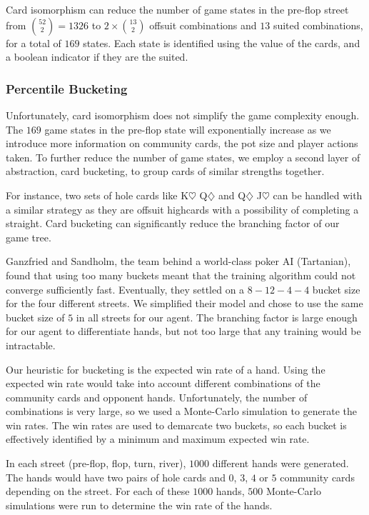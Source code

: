 \documentclass{article}
\begin{document}
Card isomorphism can reduce the number of game states in the pre-flop street from ${52 \choose 2} = 1326$ to $2 \times {13 \choose 2}$ offsuit combinations and $13$ suited combinations, for a total of $169$ states. Each state is identified using the value of the cards, and a boolean indicator if they are the suited.

\subsubsection{Percentile Bucketing}
Unfortunately, card isomorphism does not simplify the game complexity enough. The $169$ game states in the pre-flop state will exponentially increase as we introduce more information on community cards, the pot size and player actions taken. To further reduce the number of game states, we employ a second layer of abstraction, card bucketing, to group cards of similar strengths together. 

For instance, two sets of hole cards like K$\heartsuit$ Q$\diamondsuit$ and Q$\diamondsuit$ J$\heartsuit$ can be handled with a similar strategy as they are offsuit highcards with a possibility of completing a straight. Card bucketing can significantly reduce the branching factor of our game tree.

Ganzfried and Sandholm, the team behind a world-class poker AI (Tartanian), found that using too many buckets meant that the training algorithm could not converge sufficiently fast. Eventually, they settled on a $8-12-4-4$ bucket size for the four different streets. We simplified their model and chose to use the same bucket size of $5$ in all streets for our agent. The branching factor is large enough for our agent to differentiate hands, but not too large that any training would be intractable.

Our heuristic for bucketing is the expected win rate of a hand. Using the expected win rate would take into account different combinations of the community cards and opponent hands. Unfortunately, the number of combinations is very large, so we used a Monte-Carlo simulation to generate the win rates. The win rates are used to demarcate two buckets, so each bucket is effectively identified by a minimum and maximum expected win rate.

In each street (pre-flop, flop, turn, river), $1000$ different hands were generated. The hands would have two pairs of hole cards and $0$, $3$, $4$ or $5$ community cards depending on the street. For each of these $1000$ hands, $500$ Monte-Carlo simulations were run to determine the win rate of the hands.
\end{document}
